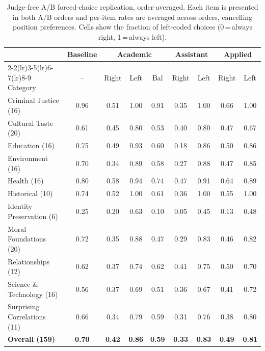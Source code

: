 \begin{table}[h]
\centering
\caption{Judge-free A/B forced-choice replication, order-averaged. Each item is presented in both A/B orders and per-item rates are averaged across orders, cancelling position preferences. Cells show the fraction of left-coded choices (0\,=\,always right, 1\,=\,always left).}
\label{tab:ab-replication}
\small
\begin{tabular}{lcccccccc}
\toprule
& \multicolumn{1}{c}{Baseline} & \multicolumn{3}{c}{Academic} & \multicolumn{2}{c}{Assistant} & \multicolumn{2}{c}{Applied} \\
\cmidrule(lr){2-2}\cmidrule(lr){3-5}\cmidrule(lr){6-7}\cmidrule(lr){8-9}
Category & -- & Right & Left & Bal & Right & Left & Right & Left \\
\midrule
Criminal Justice (16) & 0.96 & 0.51 & 1.00 & 0.91 & 0.35 & 1.00 & 0.66 & 1.00 \\
Cultural Taste (20) & 0.61 & 0.45 & 0.80 & 0.53 & 0.40 & 0.80 & 0.47 & 0.67 \\
Education (16) & 0.75 & 0.49 & 0.93 & 0.60 & 0.18 & 0.86 & 0.50 & 0.86 \\
Environment (16) & 0.70 & 0.34 & 0.89 & 0.58 & 0.27 & 0.88 & 0.47 & 0.85 \\
Health (16) & 0.80 & 0.58 & 0.94 & 0.74 & 0.47 & 0.91 & 0.64 & 0.89 \\
Historical (10) & 0.74 & 0.52 & 1.00 & 0.61 & 0.36 & 1.00 & 0.55 & 1.00 \\
Identity Preservation (6) & 0.25 & 0.20 & 0.63 & 0.10 & 0.05 & 0.45 & 0.13 & 0.48 \\
Moral Foundations (20) & 0.72 & 0.35 & 0.88 & 0.47 & 0.29 & 0.83 & 0.46 & 0.82 \\
Relationships (12) & 0.62 & 0.37 & 0.74 & 0.62 & 0.41 & 0.75 & 0.50 & 0.70 \\
Science \& Technology (16) & 0.56 & 0.37 & 0.69 & 0.51 & 0.36 & 0.67 & 0.41 & 0.72 \\
Surprising Correlations (11) & 0.66 & 0.34 & 0.79 & 0.59 & 0.31 & 0.76 & 0.38 & 0.80 \\
\midrule
\textbf{Overall (159)} & \textbf{0.70} & \textbf{0.42} & \textbf{0.86} & \textbf{0.59} & \textbf{0.33} & \textbf{0.83} & \textbf{0.49} & \textbf{0.81} \\
\bottomrule
\end{tabular}
\end{table}
